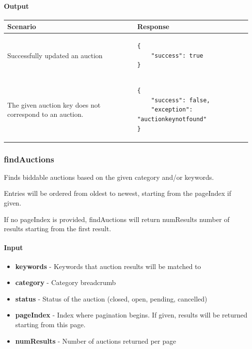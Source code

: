 \documentclass[12pt,a4paper]{article}
\begin{document}
\paragraph{Output}
\begin{center}
    \begin{tabular}{| p{7cm} | l |}
        \hline
        \textbf{Scenario} & \textbf{Response} \\
        \hline
        Successfully updated an auction &
        \begin{lstlisting}[language=tablejson,firstnumber=1]
{
    "success": true
}
        \end{lstlisting} \\ 
        \hline
        The given auction key does not correspond to an auction. & 
        \begin{lstlisting}[language=tablejson,firstnumber=1]
{
    "success": false,
    "exception": "auctionkeynotfound"
}
        \end{lstlisting} \\
        \hline
    \end{tabular}
\end{center}

\pagebreak
\subsubsection{findAuctions}
Finds biddable auctions based on the given category and/or keywords. 

Entries will be ordered from
oldest to newest, starting from the pageIndex if given. 

If no pageIndex is
provided, findAuctions will return numResults number of results starting from
the first result.

\paragraph{Input} 

\begin{itemize}
    \item \textbf{keywords} - Keywords that auction results will be matched to
    \item \textbf{category} - Category breadcrumb
    \item \textbf{status} - Status of the auction (closed, open, pending, cancelled)
    \item \textbf{pageIndex} - Index where pagination begins. If given, results will be returned starting from this page.
    \item \textbf{numResults} - Number of auctions returned per page
\end{itemize}
\end{document}
